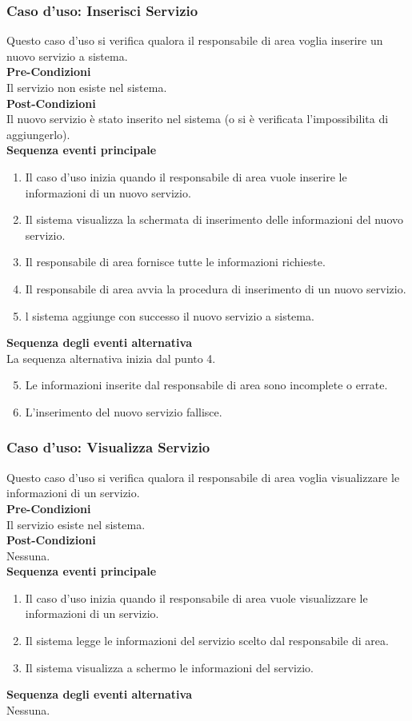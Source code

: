 \documentclass[green, fancy, 11pt]{elegantbook}
\begin{document}
\subsubsection{Caso d'uso: Inserisci Servizio}
\noindent
Questo caso d’uso si verifica qualora il responsabile di area voglia inserire un nuovo servizio a sistema.\\
\textbf{Pre-Condizioni}\\
Il servizio non esiste nel sistema.\\
\textbf{Post-Condizioni}\\
Il nuovo servizio è stato inserito nel sistema (o si è verificata l’impossibilita di aggiungerlo).\\
\textbf{Sequenza eventi principale}
\begin{enumerate}
	\item Il caso d’uso inizia quando il responsabile di area vuole inserire le informazioni di un nuovo servizio.
	\item Il sistema visualizza la schermata di inserimento delle informazioni del nuovo servizio.
	\item Il responsabile di area fornisce tutte le informazioni richieste.
	\item Il responsabile di area avvia la procedura di inserimento di un nuovo servizio.
	\item l sistema aggiunge con successo il nuovo servizio a sistema.
\end{enumerate}
\textbf{Sequenza degli eventi alternativa}\\
La sequenza alternativa inizia dal punto 4.
\begin{enumerate}
	\setcounter{enumi}{4}
	\item Le informazioni inserite dal responsabile di area sono incomplete o errate.
	\item L’inserimento del nuovo servizio fallisce.
\end{enumerate}
\newpage

\subsubsection{Caso d'uso: Visualizza Servizio}
\noindent
Questo caso d’uso si verifica qualora il responsabile di area voglia visualizzare le informazioni di un servizio.\\
\textbf{Pre-Condizioni}\\
Il servizio esiste nel sistema.\\
\textbf{Post-Condizioni}\\
Nessuna.\\
\textbf{Sequenza eventi principale}
\begin{enumerate}
	\item Il caso d’uso inizia quando il responsabile di area vuole visualizzare le informazioni di un servizio.
	\item Il sistema legge le informazioni del servizio scelto dal responsabile di area.
	\item Il sistema visualizza a schermo le informazioni del servizio.
\end{enumerate}
\textbf{Sequenza degli eventi alternativa}\\
Nessuna.
\end{document}
